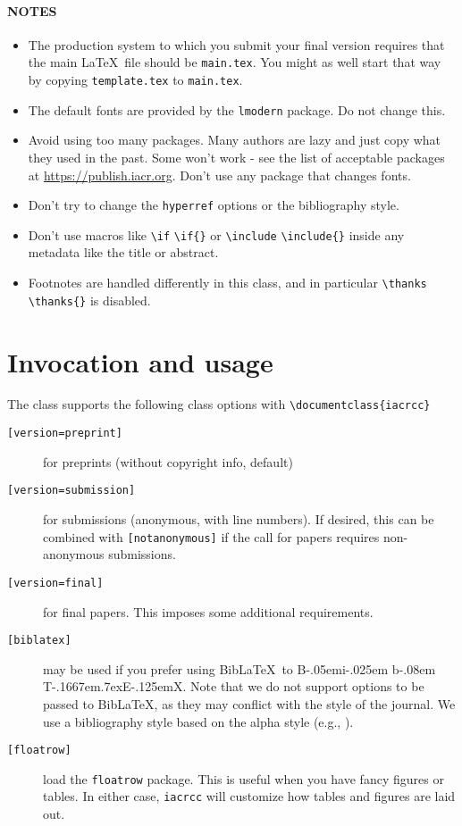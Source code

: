 \documentclass{iacrcc}
\newcommand{\cmd}[2][]{%
  \def\FirstArg{#1}
  \ifx\FirstArg\empty
    \texttt{\textbackslash{}#2}%
  \else
    \texttt{\textbackslash{}#2\{#1\}}%
  \fi
}
\def\BibTeX{{\rm B\kern-.05em{\sc i\kern-.025em b}\kern-.08em
    T\kern-.1667em\lower.7ex\hbox{E}\kern-.125emX}}
\def\BibLaTeX{Bib\LaTeX}
\begin{document}
\paragraph*{NOTES}
\begin{itemize}
\item The production system to which you submit your final version requires
  that the main \LaTeX\ file should be \texttt{main.tex}. You might as
  well start that way by copying \texttt{template.tex} to \texttt{main.tex}.
\item The default fonts are provided by the \verb+lmodern+ package. Do not
  change this.
\item Avoid using too many packages. Many authors are lazy and just
  copy what they used in the past. Some won't work - see the list of
  acceptable packages at \url{https://publish.iacr.org}. Don't use any
  package that changes fonts.
\item Don't try to change the \texttt{hyperref} options or the bibliography style.
\item Don't use macros like \cmd{if} or \cmd{include} inside any
  metadata like the title or abstract.
\item Footnotes are handled differently in this class, and in
  particular \cmd{thanks} is disabled.
\end{itemize}

\section{Invocation and usage}

The class supports the following class options with \verb+\documentclass{iacrcc}+
\begin{description}
\item[\texttt{[version=preprint]}] for preprints (without copyright info, default)
\item[\texttt{[version=submission]}] for submissions (anonymous, with
  line numbers).  If desired, this can be combined with
  \texttt{[notanonymous]} if the call for papers requires
  non-anonymous submissions.
\item[\texttt{[version=final]}] for final papers. This imposes some
  additional requirements.
\item[\texttt{[biblatex]}] may be used if you prefer using
  \BibLaTeX\ to \BibTeX. Note that we do not support options to be
  passed to \BibLaTeX, as they may conflict with the style of the journal. We use
  a bibliography style based on the alpha style (e.g., \cite{RSA78}).
\item[\texttt{[floatrow]}] load the \texttt{floatrow} package. This is useful
  when you have fancy figures or tables. In either case, \texttt{iacrcc}
  will customize how tables and figures are laid out.
\end{description}
\end{document}
